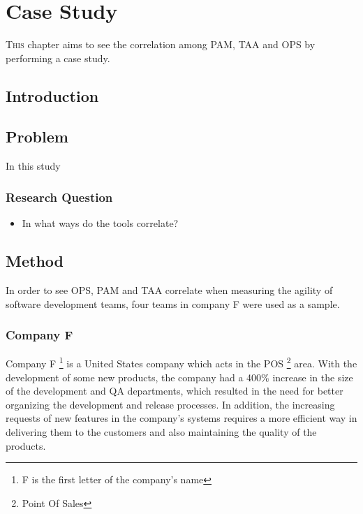 \chapter{Case Study}
\label{ch:case_study}

\newcommand{\mysubparagraph}[1]{\subparagraph{#1}\mbox{}\\}

\lettrine[lines=4, loversize=-0.1, lraise=0.1]{T}{his} chapter aims to see the correlation among PAM, TAA and OPS by performing a case study.

\section{Introduction}

\section{Problem}
In this study

\subsection{Research Question}
\begin{itemize}
	\item In what ways do the tools correlate?
\end{itemize}

\section{Method}
In order to see OPS, PAM and TAA correlate when measuring the agility of software development teams, four teams in company F were used as a sample.

\subsection{Company F}
Company F \footnote{F is the first letter of the company's name} is a United States company which acts in the POS \footnote{Point Of Sales} area. With the development of some new products, the company had a 400\% increase in the size of the development and QA departments, which resulted in the need for better organizing the development and release processes. In addition, the increasing requests of new features in the company's systems requires a more efficient way in delivering them to the customers and also maintaining the quality of the products.

